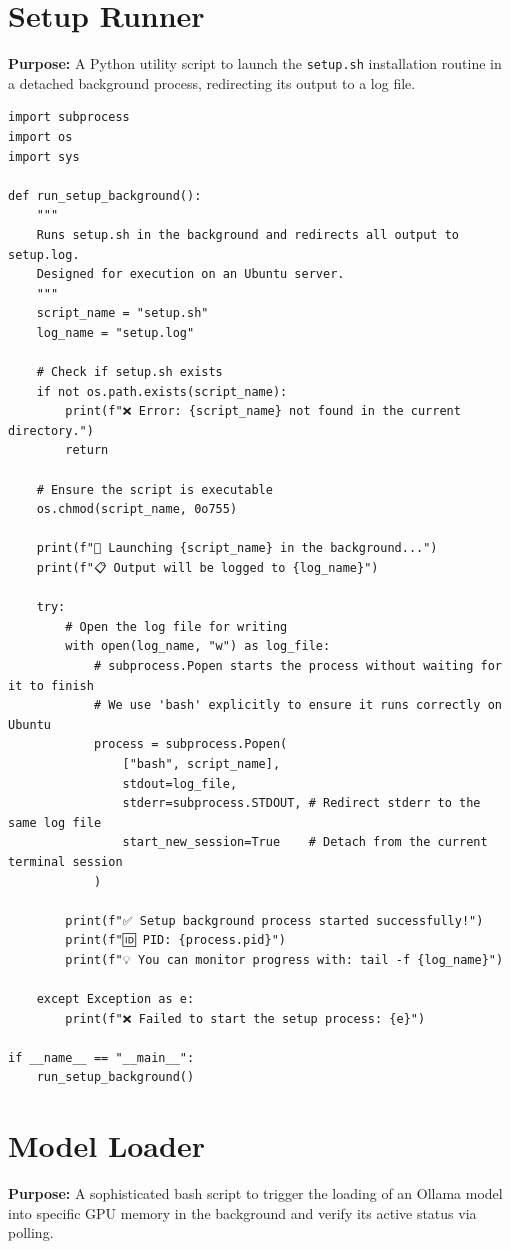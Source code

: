 \documentclass[11pt]{article}
\begin{document}
\section{Setup Runner} \label{sec:runsetup}
\textbf{Purpose:} A Python utility script to launch the \texttt{setup.sh} installation routine in a detached background process, redirecting its output to a log file.

\begin{lstlisting}[style=pythoncode, caption={run\_setup.py}]
import subprocess
import os
import sys

def run_setup_background():
    """
    Runs setup.sh in the background and redirects all output to setup.log.
    Designed for execution on an Ubuntu server.
    """
    script_name = "setup.sh"
    log_name = "setup.log"
    
    # Check if setup.sh exists
    if not os.path.exists(script_name):
        print(f"❌ Error: {script_name} not found in the current directory.")
        return

    # Ensure the script is executable
    os.chmod(script_name, 0o755)

    print(f"🚀 Launching {script_name} in the background...")
    print(f"📋 Output will be logged to {log_name}")

    try:
        # Open the log file for writing
        with open(log_name, "w") as log_file:
            # subprocess.Popen starts the process without waiting for it to finish
            # We use 'bash' explicitly to ensure it runs correctly on Ubuntu
            process = subprocess.Popen(
                ["bash", script_name],
                stdout=log_file,
                stderr=subprocess.STDOUT, # Redirect stderr to the same log file
                start_new_session=True    # Detach from the current terminal session
            )
        
        print(f"✅ Setup background process started successfully!")
        print(f"🆔 PID: {process.pid}")
        print(f"💡 You can monitor progress with: tail -f {log_name}")

    except Exception as e:
        print(f"❌ Failed to start the setup process: {e}")

if __name__ == "__main__":
    run_setup_background()
\end{lstlisting}


\section{Model Loader} \label{sec:loader}
\textbf{Purpose:} A sophisticated bash script to trigger the loading of an Ollama model into specific GPU memory in the background and verify its active status via polling.
\end{document}
